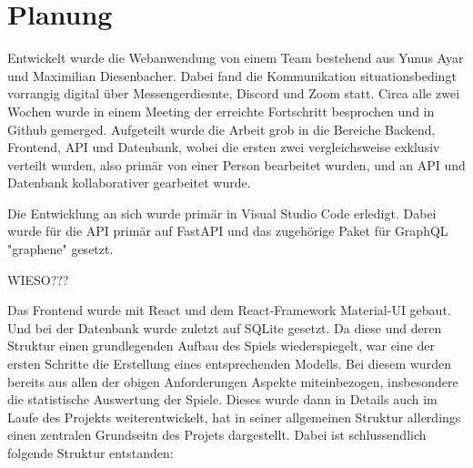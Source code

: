 \section{Planung}

Entwickelt wurde die Webanwendung von einem Team bestehend aus Yunus Ayar und Maximilian Diesenbacher. Dabei fand die Kommunikation situationsbedingt vorrangig digital über Messengerdiesnte, Discord und Zoom statt. Circa alle zwei Wochen wurde in einem Meeting der erreichte Fortschritt besprochen und in Github gemerged. Aufgeteilt wurde die Arbeit grob in die Bereiche Backend, Frontend, API und Datenbank, wobei die ersten zwei vergleichsweise exklusiv verteilt wurden, also primär von einer Person bearbeitet wurden, und an API und Datenbank kollaborativer gearbeitet wurde.

Die Entwicklung an sich wurde primär in Visual Studio Code erledigt. Dabei wurde für die API primär auf FastAPI und das zugehörige Paket für GraphQL "graphene" gesetzt. 

WIESO???

Das Frontend wurde mit React und dem React-Framework Material-UI gebaut. Und bei der Datenbank wurde zuletzt auf SQLite gesetzt. Da diese und deren Struktur einen grundlegenden Aufbau des Spiels wiederspiegelt, war eine der ersten Schritte die Erstellung eines entsprechenden Modells. Bei diesem wurden bereits aus allen der obigen Anforderungen Aspekte miteinbezogen, insbesondere die statistische Auswertung der Spiele. Dieses wurde dann in Details auch im Laufe des Projekts weiterentwickelt, hat in seiner allgemeinen Struktur allerdings einen zentralen Grundseitn des Projets dargestellt. Dabei ist schlussendlich folgende Struktur entstanden:
